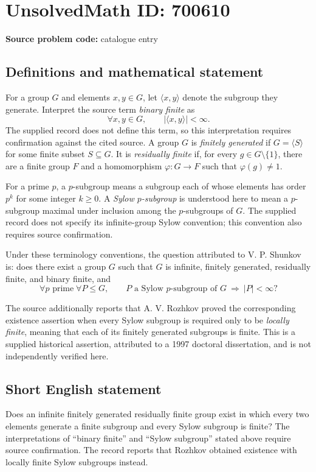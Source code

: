 \documentclass[11pt]{article}
\begin{document}
\section*{UnsolvedMath ID: 700610}
\textbf{Source problem code:} catalogue entry
\subsection{Definitions and mathematical statement}
For a group \(G\) and elements \(x,y\in G\), let \(\langle x,y\rangle\) denote the subgroup they generate. Interpret the source term \emph{binary finite} as
\[
\forall x,y\in G,\qquad |\langle x,y\rangle|<\infty.
\]
The supplied record does not define this term, so this interpretation requires confirmation against the cited source. A group \(G\) is \emph{finitely generated} if \(G=\langle S\rangle\) for some finite subset \(S\subseteq G\). It is \emph{residually finite} if, for every \(g\in G\setminus\{1\}\), there are a finite group \(F\) and a homomorphism \(\varphi:G\to F\) such that \(\varphi(g)\ne 1\).

For a prime \(p\), a \(p\)-subgroup means a subgroup each of whose elements has order \(p^k\) for some integer \(k\geq 0\). A \emph{Sylow \(p\)-subgroup} is understood here to mean a \(p\)-subgroup maximal under inclusion among the \(p\)-subgroups of \(G\). The supplied record does not specify its infinite-group Sylow convention; this convention also requires source confirmation.

Under these terminology conventions, the question attributed to V. P. Shunkov is: does there exist a group \(G\) such that \(G\) is infinite, finitely generated, residually finite, and binary finite, and
\[
\forall p\text{ prime}\;\forall P\leq G,\qquad
P\text{ a Sylow }p\text{-subgroup of }G
\ \Longrightarrow\ |P|<\infty?
\]

The source additionally reports that A. V. Rozhkov proved the corresponding existence assertion when every Sylow subgroup is required only to be \emph{locally finite}, meaning that each of its finitely generated subgroups is finite. This is a supplied historical assertion, attributed to a 1997 doctoral dissertation, and is not independently verified here.
\subsection{Short English statement}
Does an infinite finitely generated residually finite group exist in which every two elements generate a finite subgroup and every Sylow subgroup is finite? The interpretations of ``binary finite'' and ``Sylow subgroup'' stated above require source confirmation. The record reports that Rozhkov obtained existence with locally finite Sylow subgroups instead.
\end{document}
